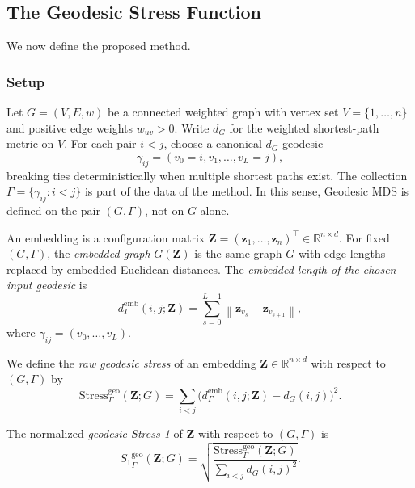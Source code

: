 \documentclass[11pt]{article}
\newcommand{\R}{\mathbb{R}}
\newcommand{\bz}{\mathbf{z}}
\newcommand{\bZ}{\mathbf{Z}}
\newcommand{\norm}[1]{\left\|#1\right\|}
\newcommand{\demb}{d^{\mathrm{emb}}}
\newcommand{\Stress}{\mathrm{Stress}}
\newcommand{\StressOne}{S_1}
\begin{document}
\subsection{The Geodesic Stress Function}
\label{sec:geodesic_stress}

We now define the proposed method.

\subsubsection*{Setup}
Let $G = (V,E,w)$ be a connected weighted graph with vertex set
$V = \{1,\ldots,n\}$ and positive edge weights $w_{uv} > 0$.  Write
$d_G$ for the weighted shortest-path metric on $V$.  For each pair
$i < j$, choose a canonical $d_G$-geodesic
\begin{equation}
  \gamma_{ij} = (v_0 = i, v_1, \ldots, v_L = j),
  \label{eq:canonical_geodesic}
\end{equation}
breaking ties deterministically when multiple shortest paths exist.  The
collection $\Gamma = \{\gamma_{ij} : i < j\}$ is part of the data of the
method.  In this sense, Geodesic MDS is defined on the pair $(G,\Gamma)$,
not on $G$ alone.

An embedding is a configuration matrix $\bZ = (\bz_1, \ldots, \bz_n)^\top
\in \R^{n \times d}$.  For fixed $(G,\Gamma)$, the \emph{embedded graph}
$G(\bZ)$ is the same graph $G$ with edge lengths replaced by embedded
Euclidean distances.  The \emph{embedded length of the chosen input
geodesic} is
\begin{equation}
  \demb_{\Gamma}(i,j;\bZ)
  = \sum_{s=0}^{L-1} \norm{\bz_{v_s} - \bz_{v_{s+1}}},
  \label{eq:emb_geodesic}
\end{equation}
where $\gamma_{ij} = (v_0, \ldots, v_L)$.

We define the \emph{raw geodesic stress} of an embedding
$\bZ \in \R^{n \times d}$ with respect to $(G,\Gamma)$ by
\begin{equation}
  \Stress^{\mathrm{geo}}_{\Gamma}(\bZ; G)
  = \sum_{i < j}
    \bigl(\demb_{\Gamma}(i,j;\bZ) - d_G(i,j)\bigr)^2.
  \label{eq:raw_geo_stress}
\end{equation}

The normalized \emph{geodesic Stress-1} of $\bZ$ with respect to
$(G,\Gamma)$ is
\begin{equation}
  {\StressOne}_{\Gamma}^{\mathrm{geo}}(\bZ; G)
  = \sqrt{
      \frac{\Stress^{\mathrm{geo}}_{\Gamma}(\bZ; G)}
           {\displaystyle\sum_{i < j} d_G(i,j)^2}
    }.
  \label{eq:geo_stress}
\end{equation}
\end{document}
